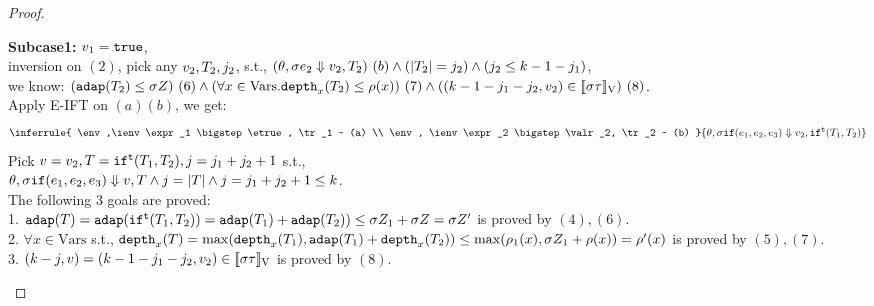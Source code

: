 \documentclass[a4paper,11pt]{article}
\theoremstyle{definition}
\begin{document}
\begin{proof}
\begin{mainitem}
{\bf Subcase1:} $v_1 = \mathtt{true}$, \\
%
inversion on $(2)$, pick any $v_2, T_2, j_2$, s.t., $ (\theta, \sigma e_2 \mathrel{\Downarrow} v_2, T_2) ~ (b) \land (|T_2| = j_2) \land (j_2 \leq k-1-j_1)$,\\
%
we know: $(\mathtt{adap}(T_2) \leq \sigma Z)~(6) \land (\forall x \in \mbox{Vars}. \mathtt{depth}_{x}(T_2) \leq \rho(x))~(7) \land ((k-1 - j_1-j_2, v_2) \in [\![ \sigma \tau ]\!]_{\text{V}})~(8)$.\\
%
Apply E-IFT on $(a) (b)$, we get:
\[
  \inferrule{
    \env,\ienv  \expr_1 \bigstep \etrue, \tr_1 ~ (a) \\
    \env, \ienv \expr_2 \bigstep \valr_2, \tr_2 ~ (b)
  }{
    \env, \ienv \eif(\expr_1, \expr_2, \expr_3) \bigstep \valr_2, \trift(\tr_1, \tr_2)
  }
\]
Pick $v = v_2, T = \mathtt{if}^{\mathtt{t}}(T_1, T_2), j =j_1+ j_2+1$ s.t.,\\
%
$\theta, \sigma \mathtt{if}(e_1, e_2, e_3) \mathrel{\Downarrow} v, T \land j =
|T| \land j = j_1 + j_2+1 \leq k$.\\
The following 3 goals are proved:\\
%
1. $\mathtt{adap}(T) = \mathtt{adap}(\mathtt{if}^{\mathtt{t}}(T_1, T_2)) = \mathtt{adap}(T_1) +
\mathtt{adap}(T_2)) \leq \sigma Z_1 + \sigma Z = \sigma Z'$ is proved by $(4),(6)$.\\
%
2. $\forall x \in \mbox{Vars}$ s.t., $ \mathtt{depth}_{x}(T) = \max(\mathtt{depth}_{x}(T_1), \mathtt{adap}(T_1) +
\mathtt{depth}_{x}(T_2)) \leq \max(\rho_1(x), \sigma Z_1 + \rho(x)) =
\rho'(x)  $ is proved by $(5), (7)$.\\
%
3. $(k - j, v) = (k-1 -j_1- j_2, v_2) \in
[\![ \sigma \tau ]\!]_{\text{V}}$ is proved by $(8)$.


\end{mainitem}
\end{proof}
\end{document}

